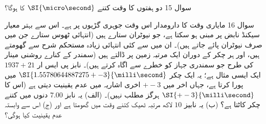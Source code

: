 سوال 15 
دو ہفتوں کا وقت کتنے 
\(\SI{\micro\second}\)
کا ہوگا؟ 

سوال 16 
مایاری وقت کا دارومدار اس وقت جوہری گڑیوں پر ہے۔ اس سے بہتر معیار سیکنڈ نابض پر مبنی ہو سکتا ہے، جو نیوٹران ستارے ہیں (انتہائی ٹھوس ستارے جن میں صرف نیوٹران پائے جاتے ہیں)۔ ان میں سے کئی انتہائی زیادہ مستحکم شرح سے گھومتے ہیں، اور ہر چکر کے دوران ایک مرتبہ زمین پر 
ڈالتے ہیں (سمندر کے کنارے روشنی مینار کی طرح جو سمندری جہاز کو خطرے سے اگاہ کرتے ہیں)۔ نابز پی ایس ار
 \(1937+21\)
ایک ایسی مثال ہے؛ یہ ایک چکر 
\(\SI{1.55780644887275+-3}{\milli\second}\)
میں پورا کرتا ہے، جہاں اخر میں 
\(+-3\)
اخری اشاریہ میں عدم یقینیت دیتی ہے (اس کا 
\(\SI{+-3}{\milli\second}\)
ہرگز مطلب نہیں)۔ 
(الف) یہ نابز 
\(7.00\)
دنوں میں کتنے چکر کاٹتا ہے؟ 
(ب) یہ نابیز 
\(10\)
لاکھ مرتبہ ٹھیک کتنے وقت میں گھومتا ہے اور 
(ج) اس سے وابستہ عدم یقینیت کیا ہوگی؟ 
